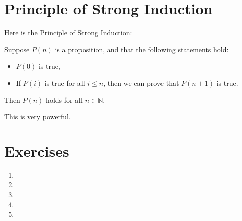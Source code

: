 \section{Principle of Strong Induction}

Here is the Principle of Strong Induction:

\begin{theorem}
Suppose $P(n)$ is a proposition, and that the following statements hold:
\begin{itemize}
    \item $P(0)$ is true,
    \item If $P(i)$ is true for all $i \leq n$, then we can prove that $P(n + 1)$ is true.
\end{itemize}
Then $P(n)$ holds for all $n \in \mathbb{N}$.
\end{theorem}

This is very powerful.

\section{Exercises}
\begin{enumerate}
    \item 
    \item 
    \item 
    \item 
    \item 
\end{enumerate}